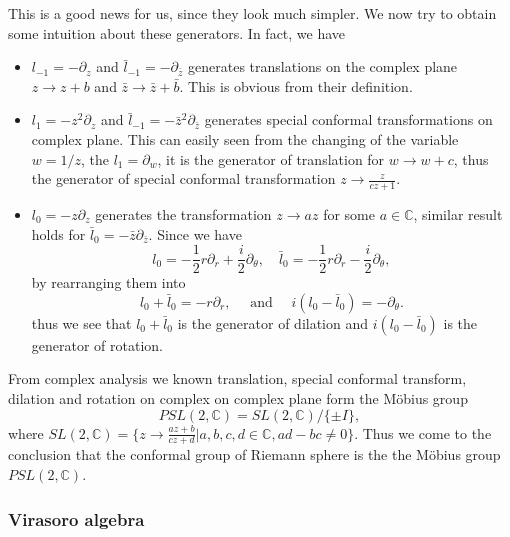 \documentclass[graybox,envcountchap,sectrefs]{svmono}
\begin{document}
This is a good news for us, since they look much simpler. We now try to obtain some intuition about these generators.
In fact, we have
\begin{itemize}
	\item 
$l_{-1}=-\partial_z$ and $\bar{l}_{-1}=-\partial_{\bar{z}}$ generates translations on the complex plane $z\to z+b$ and $\bar{z}\to \bar{z}+\bar{b}$. This is obvious from their definition.
\item $l_{1}=-z^2\partial_z$ and $\bar{l}_{-1}=-\bar{z}^2\partial_{\bar{z}}$ generates special conformal transformations on complex plane. This can easily seen from the changing of the variable $w=1/z$, the $l_{1}=\partial_w$, it is the generator of translation for $w\to w+c$, thus the generator of special conformal transformation $z\to \frac{z}{cz+1}$.
\item $l_{0}=-z\partial_z$  generates the transformation $z\to a z$ for some $a\in \mathbb{C}$, similar result holds for $\bar{l}_{0}=-\bar{z}\partial_{\bar{z}}$. Since we have \begin{equation}
     l_{0}=-\frac{1}{2} r \partial_{r}+\frac{i}{2} \partial_{\theta}, \quad \bar{l}_{0}=-\frac{1}{2} r \partial_{r}-\frac{i}{2} \partial_{\theta},
    \end{equation}
by rearranging them into 
    \begin{equation}
    l_{0}+\bar{l}_{0}=-r \partial_{r}, \quad \text { and } \quad i\left(l_{0}-\bar{l}_{0}\right)=-\partial_{\theta}.
    \end{equation}
    thus we see that $l_{0}+\bar{l}_{0}$ is the generator of dilation and $i\left(l_{0}-\bar{l}_{0}\right)$ is the generator of rotation.
\end{itemize}
From complex analysis we known translation, special conformal transform, dilation and rotation on complex on complex plane form the M\"{o}bius group
\begin{equation}
	PSL(2,\mathbb{C})=SL(2,\mathbb{C})/\{\pm I\},
\end{equation}
where $SL(2,\mathbb{C})=\{z\to \frac{az+b}{cz+d}|a,b,c,d\in\mathbb{C},ad-bc\neq 0\}$. Thus we come to the conclusion that the conformal group of Riemann sphere is the the M\"{o}bius group $PSL(2,\mathbb{C})$.

\subsubsection{Virasoro algebra}
\end{document}
